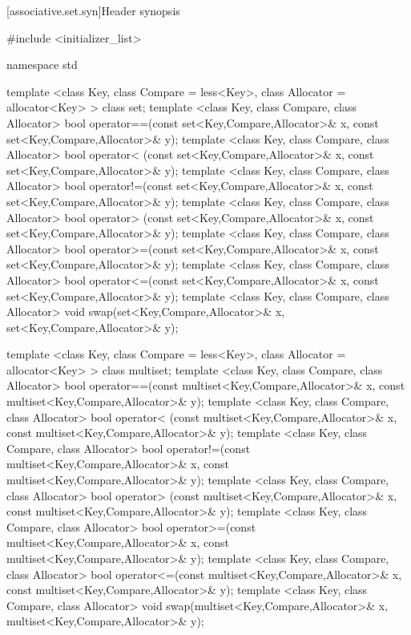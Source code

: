 [associative.set.syn]{Header  synopsis}%

\begin{codeblock}
#include <initializer_list>

namespace std {

  template <class Key, class Compare = less<Key>,
            class Allocator = allocator<Key> >
    class set;
  template <class Key, class Compare, class Allocator>
    bool operator==(const set<Key,Compare,Allocator>& x,
                    const set<Key,Compare,Allocator>& y);
  template <class Key, class Compare, class Allocator>
    bool operator< (const set<Key,Compare,Allocator>& x,
                    const set<Key,Compare,Allocator>& y);
  template <class Key, class Compare, class Allocator>
    bool operator!=(const set<Key,Compare,Allocator>& x,
                    const set<Key,Compare,Allocator>& y);
  template <class Key, class Compare, class Allocator>
    bool operator> (const set<Key,Compare,Allocator>& x,
                    const set<Key,Compare,Allocator>& y);
  template <class Key, class Compare, class Allocator>
    bool operator>=(const set<Key,Compare,Allocator>& x,
                    const set<Key,Compare,Allocator>& y);
  template <class Key, class Compare, class Allocator>
    bool operator<=(const set<Key,Compare,Allocator>& x,
                    const set<Key,Compare,Allocator>& y);
  template <class Key, class Compare, class Allocator>
    void swap(set<Key,Compare,Allocator>& x,
              set<Key,Compare,Allocator>& y);

  template <class Key, class Compare = less<Key>,
            class Allocator = allocator<Key> >
    class multiset;
  template <class Key, class Compare, class Allocator>
    bool operator==(const multiset<Key,Compare,Allocator>& x,
                    const multiset<Key,Compare,Allocator>& y);
  template <class Key, class Compare, class Allocator>
    bool operator< (const multiset<Key,Compare,Allocator>& x,
                    const multiset<Key,Compare,Allocator>& y);
  template <class Key, class Compare, class Allocator>
    bool operator!=(const multiset<Key,Compare,Allocator>& x,
                    const multiset<Key,Compare,Allocator>& y);
  template <class Key, class Compare, class Allocator>
    bool operator> (const multiset<Key,Compare,Allocator>& x,
                    const multiset<Key,Compare,Allocator>& y);
  template <class Key, class Compare, class Allocator>
    bool operator>=(const multiset<Key,Compare,Allocator>& x,
                    const multiset<Key,Compare,Allocator>& y);
  template <class Key, class Compare, class Allocator>
    bool operator<=(const multiset<Key,Compare,Allocator>& x,
                    const multiset<Key,Compare,Allocator>& y);
  template <class Key, class Compare, class Allocator>
    void swap(multiset<Key,Compare,Allocator>& x,
              multiset<Key,Compare,Allocator>& y);
}
\end{codeblock}

